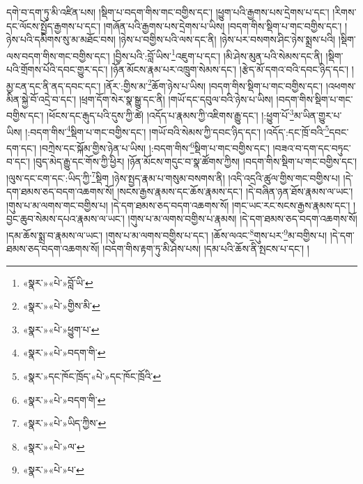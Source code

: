 དགེ་བ་དག་ཏུ་མི་འཛིན་པས། །སྡིག་པ་བདག་གིས་གང་བགྱིས་དང་། །ཕྱུག་པའི་རྒྱགས་པས་དྲེགས་པ་དང་། །རིགས་དང་ལོངས་སྤྱོད་རྒྱགས་པ་དང་། །གཞོན་པའི་རྒྱགས་པས་དྲེགས་པ་ཡིས། །བདག་གིས་སྡིག་པ་གང་བགྱིས་དང་། །ཉེས་པའི་དམིགས་སུ་མ་མཐོང་བས། །ཉེས་པ་བགྱིས་པའི་ལས་དང་ནི། །ཉེས་པར་བསགས་ཤིང་ཉེས་སྨྲས་པའི། །སྡིག་ལས་བདག་གིས་གང་བགྱིས་དང་། །བྱིས་པའི་:བློ་ཡིས་\footnote{«སྣར་»«པེ་»བློ་ཡི་}འཇུག་པ་དང་། །མི་ཤེས་མུན་པའི་སེམས་དང་ནི། །སྡིག་པའི་གྲོགས་པོའི་དབང་གྱུར་དང་། །ཉོན་མོངས་རྣམ་པར་འཁྲུག་སེམས་དང་། །རྩེད་མོ་དགའ་བའི་དབང་ཉིད་དང་། །མྱ་ངན་དང་ནི་ནད་དབང་དང་། །ནོར་:གྱིས་མ་\footnote{«སྣར་»«པེ་»གྱིས་མི་}ཆོག་ཉེས་པ་ཡིས། །བདག་གིས་སྡིག་པ་གང་བགྱིས་དང་། །འཕགས་མིན་སྐྱེ་བོ་འདྲེ་བ་དང་། །ཕྲག་དོག་སེར་སྣ་སྒྱུ་དང་ནི། །གཡོ་དང་དབུལ་བའི་ཉེས་པ་ཡིས། །བདག་གིས་སྡིག་པ་གང་བགྱིས་དང་། །ཕོངས་དང་རྒུད་པའི་དུས་ཀྱི་ཚེ། །འདོད་པ་རྣམས་ཀྱི་འཇིགས་རྒྱུ་དང་། །:ཕྱུག་པོ་\footnote{«སྣར་»«པེ་»ཕྱུག་པ་}མ་ཡིན་གྱུར་པ་ཡིས། །:བདག་གིས་\footnote{«སྣར་»«པེ་»བདག་གི་}སྡིག་པ་གང་བགྱིས་དང་། །གཡོ་བའི་སེམས་ཀྱི་དབང་ཉིད་དང་། །འདོད་:དང་ཁྲོ་བའི་\footnote{«སྣར་»དང་ཁོང་ཁྲོད་«པེ་»དང་ཁོང་ཁྲོའི་}དབང་དག་དང་། །བཀྲེས་དང་སྐོམ་གྱིས་ཉེན་པ་ཡིས། །:བདག་གིས་\footnote{«སྣར་»«པེ་»བདག་གི་}སྡིག་པ་གང་བགྱིས་དང་། །བཟའ་བ་དག་དང་བཏུང་བ་དང་། །བུད་མེད་རྒྱུ་དང་གོས་ཀྱི་ཕྱིར། །ཉོན་མོངས་གདུང་བ་སྣ་ཚོགས་ཀྱིས། །བདག་གིས་སྡིག་པ་གང་བགྱིས་དང་། །ལུས་དང་ངག་དང་:ཡིད་ཀྱི་\footnote{«སྣར་»«པེ་»ཡིད་ཀྱིས་}སྡིག །ཉེས་སྤྱད་རྣམ་པ་གསུམ་བསགས་ནི། །འདི་འདྲའི་ཚུལ་གྱིས་གང་བགྱིས་པ། །དེ་དག་ཐམས་ཅད་བདག་འཆགས་སོ། །སངས་རྒྱས་རྣམས་དང་ཆོས་རྣམས་དང་། །དེ་བཞིན་ཉན་ཐོས་རྣམས་ལ་ཡང་། །གུས་པ་མ་ལགས་གང་བགྱིས་པ། །དེ་དག་ཐམས་ཅད་བདག་འཆགས་སོ། །གང་ཡང་རང་སངས་རྒྱས་རྣམས་དང་། །བྱང་ཆུབ་སེམས་དཔའ་རྣམས་ལ་ཡང་། །གུས་པ་མ་ལགས་བགྱིས་པ་རྣམས། །དེ་དག་ཐམས་ཅད་བདག་འཆགས་སོ། །དམ་ཆོས་སྨྲ་བ་རྣམས་ལ་ཡང་། །གུས་པ་མ་ལགས་བགྱིས་པ་དང་། །ཆོས་ལའང་\footnote{«སྣར་»«པེ་»ལ་}གུས་པར་\footnote{«སྣར་»«པེ་»པ་}མ་བགྱིས་པ། །དེ་དག་ཐམས་ཅད་བདག་འཆགས་སོ། །བདག་གིས་རྟག་ཏུ་མི་ཤེས་པས། །དམ་པའི་ཆོས་ནི་སྤངས་པ་དང་། །
